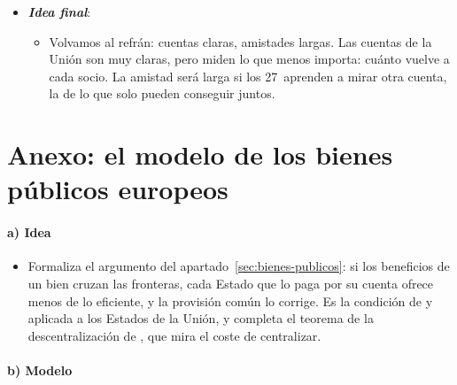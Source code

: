 \documentclass[11pt]{article}
\begin{document}
\begin{itemize}
\begin{itemize}
  \item Es el método que propuso  en su declaración de 1950: «Europa no se hará de una vez ni en una obra de conjunto: se hará gracias a realizaciones concretas, que creen en primer lugar una solidaridad de hecho»\footnote{En el original, \textcite{Schuman1950Declaracion}: «L'Europe ne se fera pas d'un coup, ni dans une construction d'ensemble : elle se fera par des réalisations concrètes créant d'abord une solidarité de fait».}. El NextGenerationEU fue una de ellas; un presupuesto para los bienes públicos europeos sería la siguiente.
  \end{itemize}
\item \textbf{\emph{Idea final}}:
  \begin{itemize}
  \item Volvamos al refrán: cuentas claras, amistades largas. Las cuentas de la Unión son muy claras, pero miden lo que menos importa: cuánto vuelve a cada socio. La amistad será larga si los 27~aprenden a mirar otra cuenta, la de lo que solo pueden conseguir juntos.
  \end{itemize}
\end{itemize}

\clearpage
\appendix

\section{Anexo: el modelo de los bienes públicos europeos}\label{anexo:bienes-publicos}

\paragraph{a) Idea}

\begin{itemize}
\item Formaliza el argumento del apartado~\ref{sec:bienes-publicos}: si los beneficios de un bien cruzan las fronteras, cada Estado que lo paga por su cuenta ofrece menos de lo eficiente, y la provisión común lo corrige. Es la condición de \textcite{Samuelson1954Pure} y \textcite{Bowen1943Interpretation} aplicada a los Estados de la Unión, y completa el teorema de la descentralización de \textcite{Oates1972Fiscal}, que mira el coste de centralizar.
\end{itemize}

\paragraph{b) Modelo}
\end{document}
